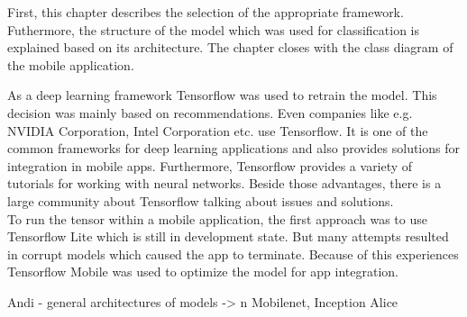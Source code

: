 First, this chapter describes the selection of the appropriate framework. Futhermore, the structure of the model which was used for classification is explained based on its architecture. The chapter closes with the class diagram of the mobile application.

As a deep learning framework Tensorflow was used to retrain the model. This decision was mainly based on recommendations. Even companies like e.g. NVIDIA Corporation, Intel Corporation etc. use Tensorflow. It is one of the common frameworks for deep learning applications and also provides solutions for integration in mobile apps. Furthermore, Tensorflow provides a variety of tutorials for working with neural networks. Beside those advantages, there is a large community about Tensorflow talking about issues and solutions. \\

To run the tensor within a mobile application, the first approach was to use Tensorflow Lite which is still in development state. But many attempts resulted in corrupt models which caused the app to terminate. Because of this experiences Tensorflow Mobile was used to optimize the model for app integration. 
		
	 Andi
	 - general architectures of models -> n Mobilenet, Inception
	 Alice

